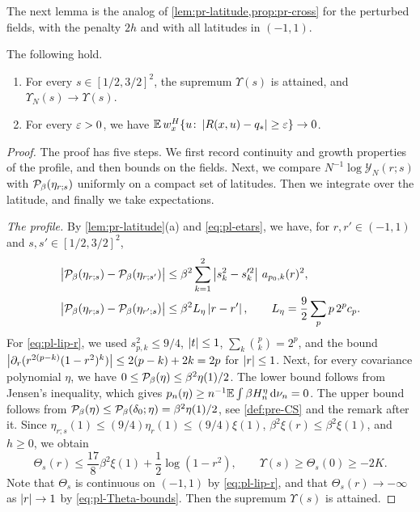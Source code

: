 The next lemma is the analog of \cref{lem:pr-latitude,prop:pr-cross} for the perturbed fields, with the penalty $2h$ and with all latitudes in $(-1,1)$.

\begin{lemma}\label{lem:pl-pressure}
The following hold.
\begin{enumerate}
\item For every $s\in[1/2,3/2]^2$, the supremum $\Upsilon(s)$ is attained, and $\Upsilon_N(s)\to\Upsilon(s)$.
\item For every $\varepsilon>0$, we have $\mathbb E\,w_x^H\{u\colon\left|R(x,u)-q_*\right|\ge\varepsilon\}\to0$.
\end{enumerate}
\end{lemma}

\begin{proof}
The proof has five steps. We first record continuity and growth properties of the profile, and then bounds on the fields. Next, we compare $N^{-1}\log\mathcal Y_N(r;s)$ with $\mathcal P_\beta(\eta_{r;s})$ uniformly on a compact set of latitudes. Then we integrate over the latitude, and finally we take expectations.

\emph{The profile.} By \cref{lem:pr-latitude}(a) and \eqref{eq:pl-etars}, we have, for $r,r'\in(-1,1)$ and $s,s'\in[1/2,3/2]^2$,
\begin{align}
\bigl|\mathcal P_\beta(\eta_{r;s})-\mathcal P_\beta(\eta_{r;s'})\bigr|&\le\beta^2\sum_{k=1}^2\left|s_k^2-s_k'^2\right|\,a_{p_0,k}(r)^2,\label{eq:pl-lip-s}\\
\bigl|\mathcal P_\beta(\eta_{r;s})-\mathcal P_\beta(\eta_{r';s})\bigr|&\le\beta^2L_\eta\left|r-r'\right|,\qquad L_\eta=\frac92\sum_pp\,2^pc_p.\label{eq:pl-lip-r}
\end{align}
For \eqref{eq:pl-lip-r}, we used $s_{p,k}^2\le9/4$, $\left|t\right|\le1$, $\sum_k\binom pk=2^p$, and the bound $\left|\partial_r(r^{2(p-k)}(1-r^2)^k)\right|\le2(p-k)+2k=2p$ for $\left|r\right|\le1$. Next, for every covariance polynomial $\eta$, we have $0\le\mathcal P_\beta(\eta)\le\beta^2\eta(1)/2$. The lower bound follows from Jensen's inequality, which gives $p_n(\eta)\ge n^{-1}\mathbb E\int\beta H_n^\eta\,\mathrm d\nu_n=0$. The upper bound follows from $\mathcal P_\beta(\eta)\le\mathcal P_\beta(\delta_0;\eta)=\beta^2\eta(1)/2$, see \cref{def:pre-CS} and the remark after it. Since $\eta_{r;s}(1)\le(9/4)\eta_r(1)\le(9/4)\xi(1)$, $\beta^2\xi(r)\le\beta^2\xi(1)$, and $h\ge0$, we obtain
\begin{equation}\label{eq:pl-Theta-bounds}
\Theta_s(r)\le\frac{17}8\beta^2\xi(1)+\frac12\log(1-r^2),\qquad
\Upsilon(s)\ge\Theta_s(0)\ge-2K .
\end{equation}
Note that $\Theta_s$ is continuous on $(-1,1)$ by \eqref{eq:pl-lip-r}, and that $\Theta_s(r)\to-\infty$ as $\left|r\right|\to1$ by \eqref{eq:pl-Theta-bounds}. Then the supremum $\Upsilon(s)$ is attained.


\end{proof}
